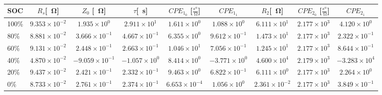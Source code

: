 
\begin{table*}[!htb]
\centering
\begin{tabular}{l|cccccccc}
\toprule
\textbf{SOC} & $R_s$[\SI{}{\ohm}] & $Z_0$ [\SI{}{\ohm}] & $ \tau $[\SI{}{\second}] & $CPE_1_0$ [$\frac{s^{\alpha}}{\SI{}{\ohm}}$] & $CPE_1_1$ & $R_2$[\SI{}{\ohm}] & $CPE_2_0$ [$\frac{s^{\alpha}}{\SI{}{\ohm}}$] & $CPE_2_1$ \\
\midrule
100\% & $9.353 \times 10^{-2}$ & $1.935 \times 10^{0}$ & $2.911 \times 10^{1}$ & $1.611 \times 10^{0}$ & $1.088 \times 10^{0}$ & $6.111 \times 10^{1}$ & $2.177 \times 10^{3}$ & $4.120 \times 10^{0}$ \\  
 80\% & $8.881 \times 10^{-2}$ & $3.666 \times 10^{-1}$ & $4.667 \times 10^{-1}$ & $6.355 \times 10^{0}$ & $9.612 \times 10^{-1}$ & $1.473 \times 10^{1}$ & $2.177 \times 10^{3}$ & $2.322 \times 10^{-1}$ \\  
 60\% & $9.131 \times 10^{-2}$ & $2.448 \times 10^{-1}$ & $2.663 \times 10^{-1}$ & $1.046 \times 10^{1}$ & $7.056 \times 10^{-1}$ & $1.245 \times 10^{1}$ & $2.177 \times 10^{3}$ & $8.644 \times 10^{-1}$ \\  
 40\% & $4.870 \times 10^{-2}$ & $-9.059 \times 10^{-1}$ & $-1.057 \times 10^{0}$ & $8.414 \times 10^{0}$ & $-3.771 \times 10^{0}$ & $4.600 \times 10^{4}$ & $2.179 \times 10^{3}$ & $-3.283 \times 10^{4}$ \\  
 20\% & $9.437 \times 10^{-2}$ & $2.421 \times 10^{-1}$ & $2.332 \times 10^{-1}$ & $9.463 \times 10^{0}$ & $6.822 \times 10^{-1}$ & $6.111 \times 10^{0}$ & $2.177 \times 10^{3}$ & $2.264 \times 10^{0}$ \\  
 0\% & $8.733 \times 10^{-2}$ & $2.761 \times 10^{-1}$ & $2.374 \times 10^{-1}$ & $6.653 \times 10^{-4}$ & $1.056 \times 10^{0}$ & $2.361 \times 10^{-2}$ & $2.177 \times 10^{3}$ & $3.849 \times 10^{-1}$ \\  
 
\bottomrule
\end{tabular}
\caption{}
\label{}
\end{table*}
